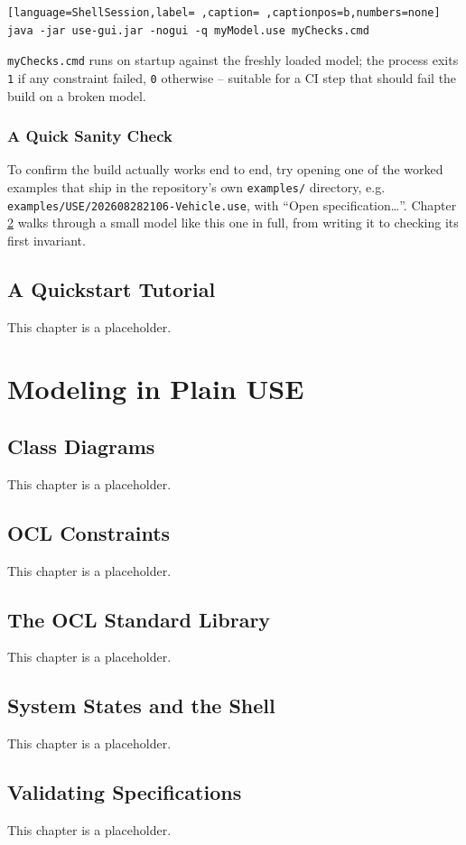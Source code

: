 \documentclass[11pt,twoside,a4paper]{book}
\begin{document}
\begin{lstlisting}[language=ShellSession,label= ,caption= ,captionpos=b,numbers=none]
java -jar use-gui.jar -nogui -q myModel.use myChecks.cmd
\end{lstlisting}

\texttt{myChecks.cmd} runs on startup against the freshly loaded model; the
process exits \texttt{1} if any constraint failed, \texttt{0} otherwise -- suitable
for a CI step that should fail the build on a broken model.

\section{A Quick Sanity Check}
\label{sec:org62e108a}
To confirm the build actually works end to end, try opening one of the
worked examples that ship in the repository's own \texttt{examples/}
directory, e.g. \texttt{examples/USE/202608282106-Vehicle.use}, with ``Open
specification\ldots{}''. Chapter \ref{sec:orgadeff9a} walks through
a small model like this one in full, from writing it to checking its
first invariant.
\chapter{A Quickstart Tutorial}
\label{sec:orgadeff9a}
This chapter is a placeholder.
\part{Modeling in Plain USE}
\label{sec:org9ef9f58}
\chapter{Class Diagrams}
\label{sec:org6ab86a8}
This chapter is a placeholder.
\chapter{OCL Constraints}
\label{sec:org0cf4a3c}
This chapter is a placeholder.
\chapter{The OCL Standard Library}
\label{sec:orgd84588d}
This chapter is a placeholder.
\chapter{System States and the Shell}
\label{sec:org245a2e0}
This chapter is a placeholder.
\chapter{Validating Specifications}
\label{sec:org6928126}
This chapter is a placeholder.
\end{document}
